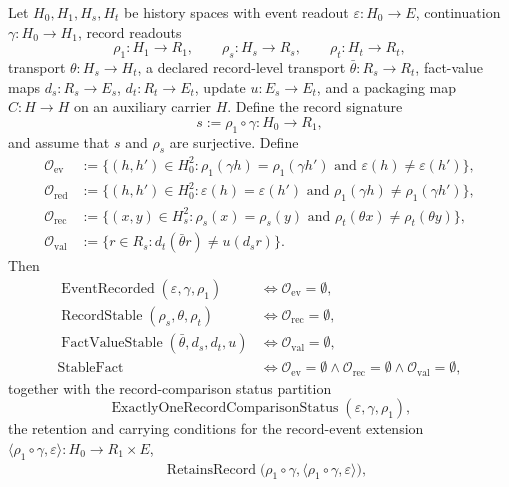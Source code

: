 \begin{theorem}\label{thm:F20}
Let \(H_0,H_1,H_s,H_t\) be history spaces with event readout
\(\varepsilon:H_0\to E\), continuation \(\gamma:H_0\to H_1\),
record readouts
\[
  \rho_1:H_1\to R_1,\qquad
  \rho_s:H_s\to R_s,\qquad
  \rho_t:H_t\to R_t,
\]
transport \(\theta:H_s\to H_t\), a declared record-level transport
\(\bar\theta:R_s\to R_t\), fact-value maps
\(d_s:R_s\to E_s\), \(d_t:R_t\to E_t\), update
\(u:E_s\to E_t\), and a packaging map \(C:H\to H\) on an auxiliary
carrier \(H\).  Define the record signature
\[
  s:=\rho_1\circ\gamma:H_0\to R_1,
\]
and assume that \(s\) and \(\rho_s\) are surjective.  Define
\begin{align*}
  \mathcal O_{\mathrm{ev}}
  &:=
  \{(h,h')\in H_0^2:
      \rho_1(\gamma h)=\rho_1(\gamma h')
      \text{ and } \varepsilon(h)\ne\varepsilon(h')\},\\
  \mathcal O_{\mathrm{red}}
  &:=
  \{(h,h')\in H_0^2:
      \varepsilon(h)=\varepsilon(h')
      \text{ and } \rho_1(\gamma h)\ne\rho_1(\gamma h')\},\\
  \mathcal O_{\mathrm{rec}}
  &:=
  \{(x,y)\in H_s^2:
      \rho_s(x)=\rho_s(y)
      \text{ and } \rho_t(\theta x)\ne\rho_t(\theta y)\},\\
  \mathcal O_{\mathrm{val}}
  &:=
  \{r\in R_s:
      d_t(\bar\theta r)\ne u(d_s r)\}.
\end{align*}
Then
\begin{align*}
  \operatorname{EventRecorded}(\varepsilon,\gamma,\rho_1)
  &\iff \mathcal O_{\mathrm{ev}}=\emptyset,\\
  \operatorname{RecordStable}(\rho_s,\theta,\rho_t)
  &\iff \mathcal O_{\mathrm{rec}}=\emptyset,\\
  \operatorname{FactValueStable}(\bar\theta,d_s,d_t,u)
  &\iff \mathcal O_{\mathrm{val}}=\emptyset,\\
  \operatorname{StableFact}
  &\iff
  \mathcal O_{\mathrm{ev}}=\emptyset
  \wedge
  \mathcal O_{\mathrm{rec}}=\emptyset
  \wedge
  \mathcal O_{\mathrm{val}}=\emptyset,
\end{align*}
together with the record-comparison status partition
\[
  \operatorname{ExactlyOneRecordComparisonStatus}
    (\varepsilon,\gamma,\rho_1),
\]
the retention and carrying conditions for the record-event extension
\(\langle\rho_1\circ\gamma,\varepsilon\rangle:H_0\to R_1\times E\),
\begin{align*}
  &\operatorname{RetainsRecord}
      \bigl(\rho_1\circ\gamma,
        \langle\rho_1\circ\gamma,\varepsilon\rangle\bigr),\\

\end{align*}
\end{theorem}
